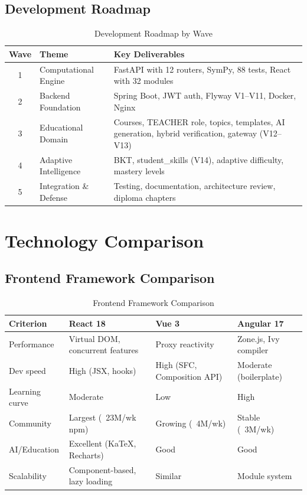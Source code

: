 \subsection{Development Roadmap}
\label{subsec:roadmap}

\begin{table}[htbp]
\centering
\caption{Development Roadmap by Wave}
\label{tab:roadmap}
\begin{tabular}{clp{8cm}}
\toprule
\textbf{Wave} & \textbf{Theme} & \textbf{Key Deliverables} \\
\midrule
1 & Computational Engine & FastAPI with 12 routers, SymPy, 88 tests, React with 32 modules \\
2 & Backend Foundation & Spring Boot, JWT auth, Flyway V1--V11, Docker, Nginx \\
3 & Educational Domain & Courses, TEACHER role, topics, templates, AI generation, hybrid verification, gateway (V12--V13) \\
4 & Adaptive Intelligence & BKT, student\_skills (V14), adaptive difficulty, mastery levels \\
5 & Integration \& Defense & Testing, documentation, architecture review, diploma chapters \\
\bottomrule
\end{tabular}
\end{table}


\section{Technology Comparison}
\label{sec:tech-comparison}

\subsection{Frontend Framework Comparison}
\label{subsec:frontend-comparison}

\begin{table}[htbp]
\centering
\caption{Frontend Framework Comparison}
\label{tab:frontend-comparison}
\begin{tabular}{p{2.5cm}p{3.5cm}p{3.5cm}p{3.5cm}}
\toprule
\textbf{Criterion} & \textbf{React 18} & \textbf{Vue 3} & \textbf{Angular 17} \\
\midrule
Performance & Virtual DOM, concurrent features & Proxy reactivity & Zone.js, Ivy compiler \\
Dev speed & High (JSX, hooks) & High (SFC, Composition API) & Moderate (boilerplate) \\
Learning curve & Moderate & Low & High \\
Community & Largest (~23M/wk npm) & Growing (~4M/wk) & Stable (~3M/wk) \\
AI/Education & Excellent (KaTeX, Recharts) & Good & Good \\
Scalability & Component-based, lazy loading & Similar & Module system \\
\bottomrule
\end{tabular}
\end{table}

